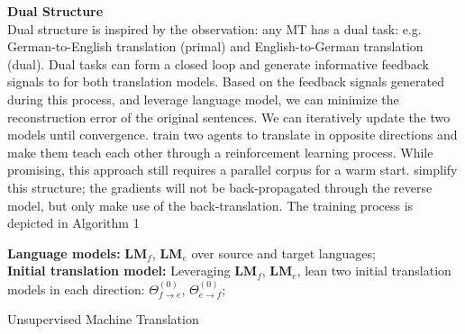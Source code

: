 



\textbf{Dual Structure}\\
Dual structure is inspired by the observation: any MT has a dual task: e.g. German-to-English translation (primal) and English-to-German translation (dual). Dual tasks can form a closed loop and generate informative  feedback signals to for both translation models. Based on the feedback signals generated during this process, and leverage language model, we can minimize the reconstruction error of the original sentences. We can iteratively update the two models until convergence.   \cite{he2016dual} train two agents to translate in opposite directions and make them teach each other through a reinforcement learning process. While promising, this approach still requires a parallel corpus for a warm start. \cite{lample2018phrase} simplify this structure; the gradients will not be back-propagated through the reverse model, but only make use of the back-translation. The training process is depicted in Algorithm 1 \cite{lample2018phrase}\\


\begin{algorithm}[h]
	\SetAlgoLined
	\textbf{Language models:} $\textbf{LM}_f$, $\textbf{LM}_e$ over source and target languages;\\
	\textbf{Initial translation model:}  Leveraging $\textbf{LM}_f$, $\textbf{LM}_e$, lean two initial translation models in each direction: $\Theta_{f\rightarrow e}^{(0)}$, ${\Theta_{e \rightarrow f}^{(0)}}$;\\
	\caption{Unsupervised Machine Translation}
\end{algorithm}


